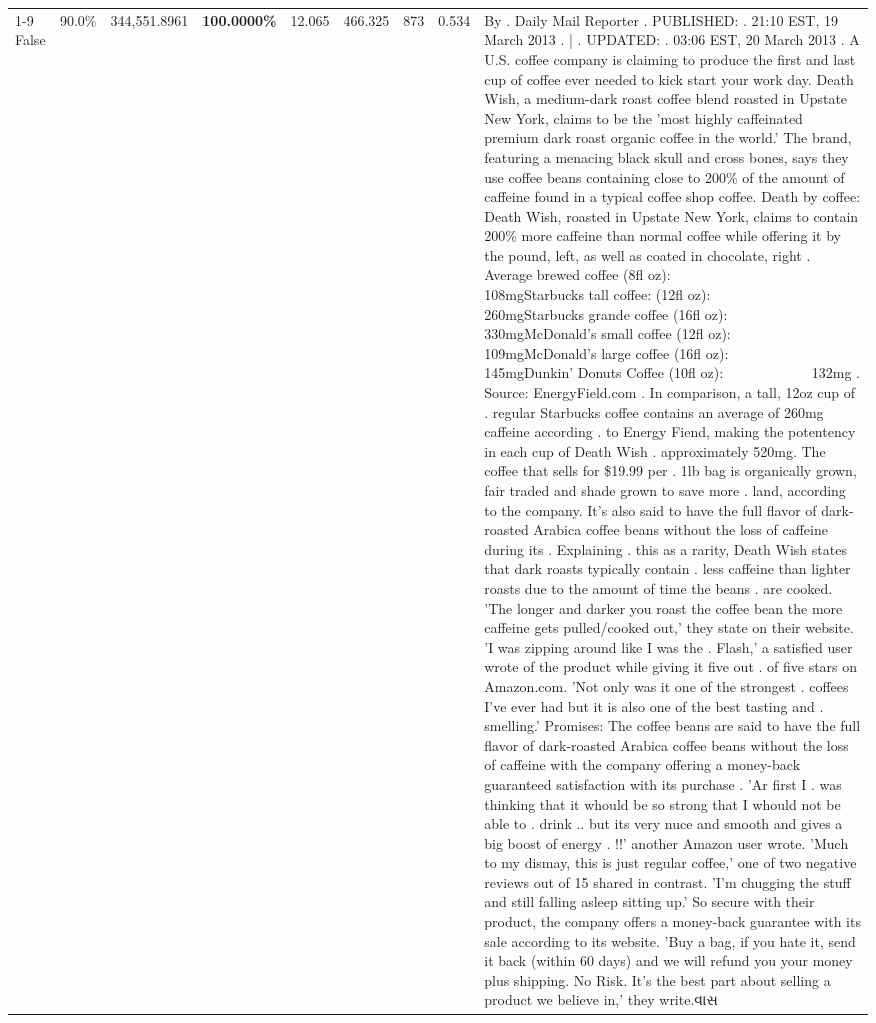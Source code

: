 \begin{table}[H]
{\begin{tabular}{lllrlllll}
\cline{1-9}
False & 90.0\% & 344,551.8961 & \bfseries \color{red} 100.0000\% & 12.065 & 466.325 & 873 & 0.534 & By . Daily Mail Reporter . PUBLISHED: . 21:10 EST, 19 March 2013 . | . UPDATED: . 03:06 EST, 20 March 2013 . A U.S. coffee company is claiming to produce the first and last cup of coffee ever needed to kick start your work day. Death Wish, a medium-dark roast coffee blend roasted in Upstate New York, claims to be the 'most highly caffeinated premium dark roast organic coffee in the world.' The brand, featuring a menacing black skull and cross bones, says they use coffee beans containing close to 200\% of the amount of caffeine found in a typical coffee shop coffee. Death by coffee: Death Wish, roasted in Upstate New York, claims to contain 200\% more caffeine than normal coffee while offering it by the pound, left, as well as coated in chocolate, right . Average brewed coffee (8fl oz):              108mgStarbucks tall coffee: (12fl oz):                260mgStarbucks grande coffee (16fl oz):         330mgMcDonald's small coffee (12fl oz):           109mgMcDonald's large coffee (16fl oz):           145mgDunkin' Donuts Coffee (10fl oz):             132mg . Source: EnergyField.com . In comparison, a tall, 12oz cup of . regular Starbucks coffee contains an average of 260mg caffeine according . to Energy Fiend, making the potentency in each cup of Death Wish . approximately 520mg. The coffee that sells for \$19.99 per . 1lb bag is organically grown, fair traded and shade grown to save more . land, according to the company. It's also said to have the full flavor of dark-roasted Arabica coffee beans without the loss of caffeine during its . Explaining . this as a rarity, Death Wish states that dark roasts typically contain . less caffeine than lighter roasts due to the amount of time the beans . are cooked. 'The longer and darker you roast the coffee bean the more caffeine gets pulled/cooked out,' they state on their website. 'I was zipping around like I was the . Flash,' a satisfied user wrote of the product while giving it five out . of five stars on Amazon.com. 'Not only was it one of the strongest . coffees I've ever had but it is also one of the best tasting and . smelling.’ Promises: The coffee beans are said to have the full flavor of dark-roasted Arabica coffee beans without the loss of caffeine with the company offering a money-back guaranteed satisfaction with its purchase . 'Ar first I . was thinking that it whould be so strong that I whould not be able to . drink .. but its very nuce and smooth and gives a big boost of energy . !!' another Amazon user wrote. 'Much to my dismay, this is just regular coffee,' one of two negative reviews out of 15 shared in contrast. 'I'm chugging the stuff and still falling asleep sitting up.' So secure with their product, the company offers a money-back guarantee with its sale according to its website. 'Buy a bag, if you hate it, send it back (within 60 days) and we will refund you your money plus shipping. No Risk. It’s the best part about selling a product we believe in,' they write.વાસ \\

\end{tabular}}
\end{table}
